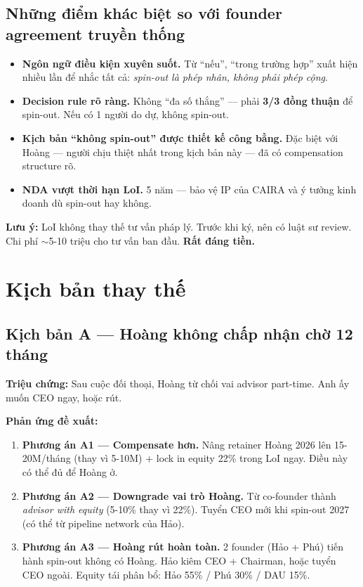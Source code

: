 \documentclass[11pt,a4paper]{article}
\begin{document}
\subsection{Những điểm khác biệt so với founder agreement truyền thống}

\begin{itemize}
\item \textbf{Ngôn ngữ điều kiện xuyên suốt.} Từ ``nếu'', ``trong trường hợp''
xuất hiện nhiều lần để nhắc tất cả: \textit{spin-out là phép nhân, không phải
phép cộng}.
\item \textbf{Decision rule rõ ràng.} Không ``đa số thắng'' --- phải
\textbf{3/3 đồng thuận} để spin-out. Nếu có 1 người do dự, không spin-out.
\item \textbf{Kịch bản ``không spin-out'' được thiết kế công bằng.} Đặc biệt
với Hoàng --- người chịu thiệt nhất trong kịch bản này --- đã có compensation
structure rõ.
\item \textbf{NDA vượt thời hạn LoI.} 5 năm --- bảo vệ IP của CAIRA và ý
tưởng kinh doanh dù spin-out hay không.
\end{itemize}

\textbf{Lưu ý:} LoI không thay thế tư vấn pháp lý. Trước khi ký, nên có luật sư
review. Chi phí $\sim$5-10 triệu cho tư vấn ban đầu. \textbf{Rất đáng tiền.}

\clearpage

\section{Kịch bản thay thế}

\subsection{Kịch bản A — Hoàng không chấp nhận chờ 12 tháng}

\textbf{Triệu chứng:} Sau cuộc đối thoại, Hoàng từ chối vai advisor part-time. Anh ấy muốn CEO ngay, hoặc rút.

\textbf{Phản ứng đề xuất:}

\begin{enumerate}
\item \textbf{Phương án A1 --- Compensate hơn.} Nâng retainer Hoàng 2026 lên 15-20M/tháng (thay vì 5-10M) + lock in equity 22\% trong LoI ngay. Điều này có thể đủ để Hoàng ở.

\item \textbf{Phương án A2 --- Downgrade vai trò Hoàng.} Từ co-founder thành \textit{advisor with equity} (5-10\% thay vì 22\%). Tuyển CEO mới khi spin-out 2027 (có thể từ pipeline network của Hảo).

\item \textbf{Phương án A3 --- Hoàng rút hoàn toàn.} 2 founder (Hảo + Phú) tiến hành spin-out không có Hoàng. Hảo kiêm CEO + Chairman, hoặc tuyển CEO ngoài. Equity tái phân bổ: Hảo 55\% / Phú 30\% / DAU 15\%.
\end{enumerate}
\end{document}
